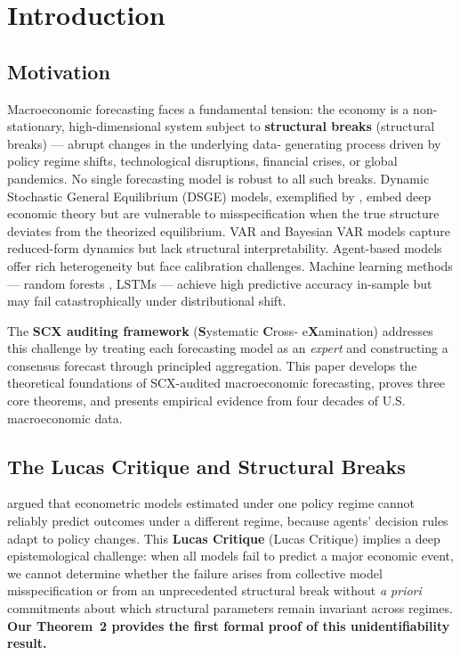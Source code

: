 \documentclass[12pt,a4paper]{article}
\begin{document}
\section{Introduction}
\label{sec:intro}

\subsection{Motivation}

Macroeconomic forecasting faces a fundamental tension: the economy is a
non-stationary, high-dimensional system subject to \textbf{structural breaks}
(structural breaks) --- abrupt changes in the underlying data-
generating process driven by policy regime shifts, technological
disruptions, financial crises, or global pandemics.  No single forecasting
model is robust to all such breaks.  Dynamic Stochastic General Equilibrium
(DSGE) models, exemplified by \citet{smets2007shocks}, embed deep economic
theory but are vulnerable to misspecification when the true structure
deviates from the theorized equilibrium.  VAR and Bayesian VAR models
\citep{sims1980macroeconomics} capture reduced-form dynamics but lack
structural interpretability.  Agent-based models \citep{tesfatsion2006agent}
offer rich heterogeneity but face calibration challenges.  Machine learning
methods --- random forests \citep{breiman2001random}, LSTMs
\citep{hochreiter1997long} --- achieve high predictive accuracy in-sample
but may fail catastrophically under distributional shift.

The \textbf{SCX auditing framework} (\textbf{S}ystematic \textbf{C}ross-
e\textbf{X}amination) addresses this challenge by treating each forecasting
model as an \emph{expert} and constructing a consensus forecast through
principled aggregation.  This paper develops the theoretical foundations
of SCX-audited macroeconomic forecasting, proves three core theorems, and
presents empirical evidence from four decades of U.S. macroeconomic data.

\subsection{The Lucas Critique and Structural Breaks}

\citet{lucas1976econometric} argued that econometric models estimated under
one policy regime cannot reliably predict outcomes under a different regime,
because agents' decision rules adapt to policy changes.  This \textbf{Lucas
Critique} (Lucas Critique) implies a deep epistemological challenge: when all
models fail to predict a major economic event, we cannot determine whether
the failure arises from collective model misspecification or from an
unprecedented structural break without \emph{a priori} commitments about
which structural parameters remain invariant across regimes.  \textbf{Our
Theorem~2 provides the first formal proof of this unidentifiability result.}
\end{document}
